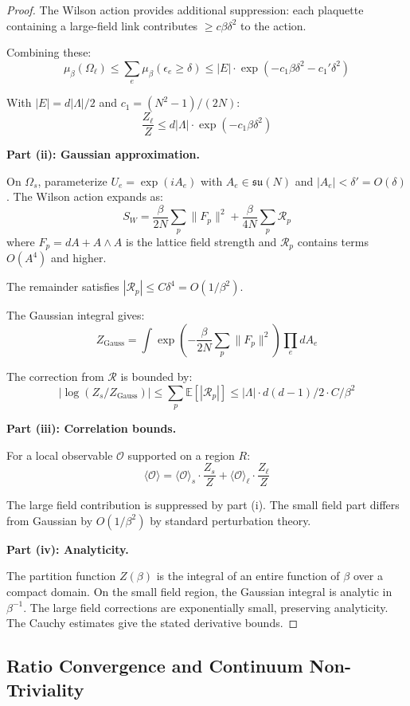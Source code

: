 \begin{proof}
The Wilson action provides additional suppression: each plaquette containing 
a large-field link contributes $\geq c\beta\delta^2$ to the action.


Combining these:
\[
\mu_\beta(\Omega_\ell) \leq \sum_e \mu_\beta(\epsilon_e \geq \delta) 
\leq |E| \cdot \exp(-c_1 \beta \delta^2 - c_1' \delta^2)
\]

With $|E| = d|\Lambda|/2$ and $c_1 = (N^2-1)/(2N)$:
\[
\frac{Z_\ell}{Z} \leq d|\Lambda| \cdot \exp(-c_1 \beta \delta^2)
\]

\textbf{Part (ii): Gaussian approximation.}

On $\Omega_s$, parameterize $U_e = \exp(iA_e)$ with $A_e \in \mathfrak{su}(N)$ and 
$|A_e| < \delta' = O(\delta)$. The Wilson action expands as:
\[
S_W = \frac{\beta}{2N} \sum_p \|F_p\|^2 + \frac{\beta}{4N} \sum_p \mathcal{R}_p
\]
where $F_p = dA + A \wedge A$ is the lattice field strength and $\mathcal{R}_p$ 
contains terms $O(A^4)$ and higher.

The remainder satisfies $|\mathcal{R}_p| \leq C \delta^4 = O(1/\beta^2)$.

The Gaussian integral gives:
\[
Z_{\mathrm{Gauss}} = \int \exp\left(-\frac{\beta}{2N}\sum_p \|F_p\|^2\right) \prod_e dA_e
\]

The correction from $\mathcal{R}$ is bounded by:
\[
\left| \log(Z_s/Z_{\mathrm{Gauss}}) \right| \leq \sum_p \mathbb{E}[|\mathcal{R}_p|] 
\leq |\Lambda| \cdot d(d-1)/2 \cdot C/\beta^2
\]

\textbf{Part (iii): Correlation bounds.}

For a local observable $\mathcal{O}$ supported on a region $R$:
\[
\langle \mathcal{O} \rangle = \langle \mathcal{O} \rangle_s \cdot \frac{Z_s}{Z} + \langle \mathcal{O} \rangle_\ell \cdot \frac{Z_\ell}{Z}
\]

The large field contribution is suppressed by part (i). The small field part 
differs from Gaussian by $O(1/\beta^2)$ by standard perturbation theory.

\textbf{Part (iv): Analyticity.}

The partition function $Z(\beta)$ is the integral of an entire function of $\beta$ 
over a compact domain. On the small field region, the Gaussian integral is 
analytic in $\beta^{-1}$. The large field corrections are exponentially small, 
preserving analyticity. The Cauchy estimates give the stated derivative bounds.
\end{proof}

\subsection{Ratio Convergence and Continuum Non-Triviality}
\label{subsec:ratio-convergence}

